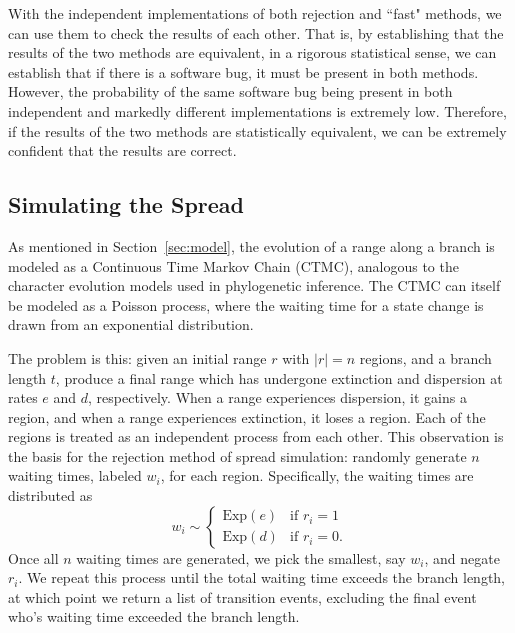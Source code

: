 \documentclass[a4paper]{article}
\begin{document}
With the independent implementations of both rejection and ``fast" methods, we
can use them to check the results of each other.
That is, by establishing that the results of the two methods are equivalent, in
a rigorous statistical sense, we can establish that if there is a software bug,
it must be present in both methods.
However, the probability of the same software bug being present in both
independent and markedly different implementations is extremely low.
Therefore, if the results of the two methods are statistically equivalent, we
can be extremely confident that the results are correct.

\subsection{Simulating the Spread}

As mentioned in Section~\ref{sec:model}, the evolution of a range along a branch is modeled as a Continuous Time Markov
Chain (CTMC), analogous to the character evolution models used in phylogenetic inference.
The CTMC can itself be modeled as a Poisson process, where the waiting time for a state change is drawn from an
exponential distribution.

The problem is this: given an initial range \( r \) with \( |r| = n \) regions, and a branch length \( t \), produce a
final range which has undergone extinction and dispersion at rates \( e \) and \( d \), respectively.
When a range experiences dispersion, it gains a region, and when a range experiences extinction, it loses a region. 
Each of the regions is treated as an independent process from each other.
This observation is the basis for the rejection method of spread simulation: randomly generate \( n \) waiting times,
labeled \( w_i \), for each region.
Specifically, the waiting times are distributed as
\begin{equation}
	\label{eq:exp-rejection} w_i \sim
	\begin{cases}
		\text{Exp}(e) & \text{if } r_i
		= 1                            \\ \text{Exp}(d) & \text{if } r_i = 0.
	\end{cases}
\end{equation}
Once all $n$ waiting times are generated, we pick the smallest, say $w_i$, and
negate $r_i$.
We repeat this process until the total waiting time exceeds the branch length,
at which point we return a list of transition events, excluding the final event
who's waiting time exceeded the branch length.
\end{document}

